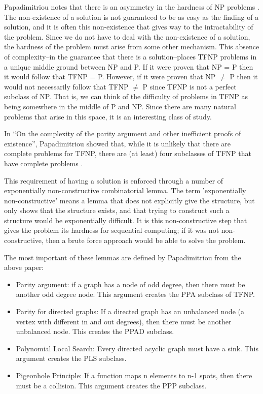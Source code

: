 \documentclass[10pt]{article}
\theoremstyle{definition}
\theoremstyle{remark}
\theoremstyle{definition}
\begin{document}
Papadimitriou notes that there is an asymmetry in the hardness of NP problems \cite{papadimitriou1994complexity}. The non-existence of a solution is not guaranteed to be as easy as the finding of a solution, and it is often this non-existence that gives way to the intractability of the problem. Since we do not have to deal with the non-existence of a solution, the hardness of the problem must arise from some other mechanism. This absence of complexity–in the guarantee that there is a solution–places TFNP problems in a unique middle ground between NP and P. If it were proven that NP = P then it would follow that TFNP = P. However, if it were proven that NP $\neq$ P then it would not necessarily follow that TFNP $\neq$ P since TFNP is not a perfect subclass of NP. That is, we can think of the difficulty of problems in TFNP as being somewhere in the middle of P and NP. Since there are many natural problems that arise in this space, it is an interesting class of study. 

In “On the complexity of the parity argument and other inefficient proofs of existence”, Papadimitriou showed that, while it is unlikely that there are complete problems for TFNP, there are (at least) four subclasses of TFNP that have complete problems \cite{papadimitriou1994complexity}.

This requirement of having a solution is enforced through a number of exponentially non-constructive combinatorial lemma. The term 'exponentially non-constructive' means a lemma that does not explicitly give the structure, but only shows that the structure exists, and that trying to construct such a structure would be exponentially difficult. It is this non-constructive step that gives the problem its hardness for sequential computing; if it was not non-constructive, then a brute force approach would be able to solve the problem. 

The most important of these lemmas are defined by Papadimitriou from the above paper:

\begin{itemize}
    \item Parity argument: if a graph has a node of odd degree, then there must be another odd degree node. This argument creates the PPA subclass of TFNP.
    \item Parity for directed graphs: If a directed graph has an unbalanced node (a vertex with different in and out degrees), then there must be another unbalanced node. This creates the PPAD subclass.
    \item Polynomial Local Search: Every directed acyclic graph must have a sink. This argument creates the PLS subclass.
    \item Pigeonhole Principle: If a function maps n elements to n-1 spots, then there must be a collision. This argument creates the PPP subclass.
\end{itemize}
\end{document}
